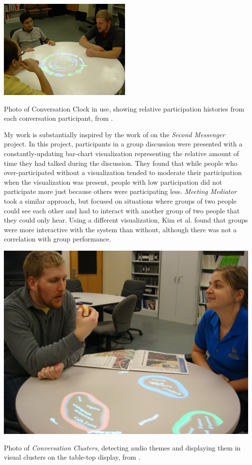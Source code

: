 \begin{marginfigure}
	\includegraphics{figures/conversation_clock.png}
	\caption{Photo of Conversation Clock in use, showing relative participation histories from each conversation participant, from \citep{Bergstrom:2007je}.}
	\label{fig:conversation-clock}
\end{marginfigure}

My work is substantially inspired by the work of \citet{DiMicco:2007ie} on the \emph{Second Messenger} project. In this project, participants in a group discussion were presented with a constantly-updating bar-chart visualization representing the relative amount of time they had talked during the discussion. They found that while people who over-participated without a visualization tended to moderate their participation when the visualization was present, people with low participation did not participate more just because others were participating less. \emph{Meeting Mediator} \citep{Kim:2008ip} took a similar approach, but focused on situations where groups of two people could see each other and had to interact with another group of two people that they could only hear. Using a different visualization, Kim et al. found that groups were more interactive with the system than without, although there was not a correlation with group performance. 

\begin{marginfigure}
	\includegraphics{figures/conversation_clusters.jpg}
	\caption{Photo of \emph{Conversation Clusters}, detecting audio themes and displaying them in visual clusters on the table-top display, from  \citep{Bergstrom:2009fe}.}
	\label{fig:conversation-clusters}
\end{marginfigure}


